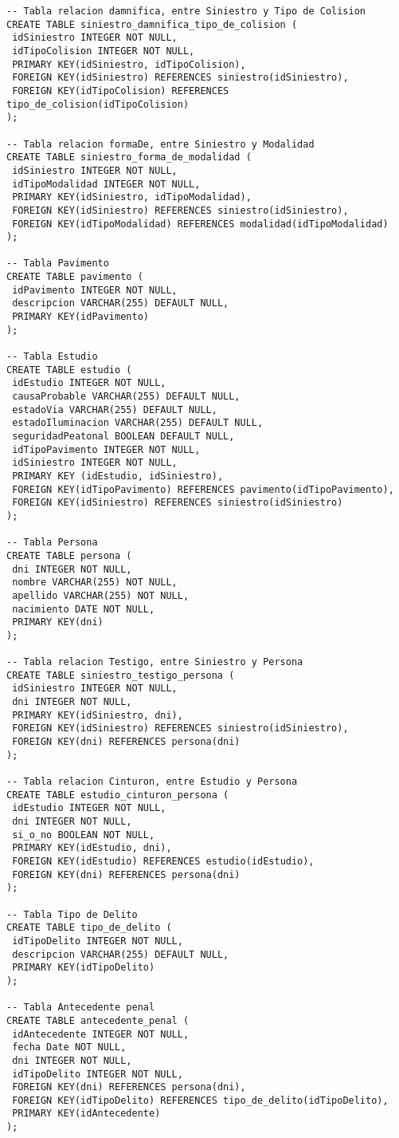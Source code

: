 \begin{verbatim}
-- Tabla relacion damnifica, entre Siniestro y Tipo de Colision
CREATE TABLE siniestro_damnifica_tipo_de_colision (
 idSiniestro INTEGER NOT NULL,
 idTipoColision INTEGER NOT NULL,
 PRIMARY KEY(idSiniestro, idTipoColision),
 FOREIGN KEY(idSiniestro) REFERENCES siniestro(idSiniestro),
 FOREIGN KEY(idTipoColision) REFERENCES tipo_de_colision(idTipoColision)
);

-- Tabla relacion formaDe, entre Siniestro y Modalidad
CREATE TABLE siniestro_forma_de_modalidad (
 idSiniestro INTEGER NOT NULL,
 idTipoModalidad INTEGER NOT NULL,
 PRIMARY KEY(idSiniestro, idTipoModalidad),
 FOREIGN KEY(idSiniestro) REFERENCES siniestro(idSiniestro),
 FOREIGN KEY(idTipoModalidad) REFERENCES modalidad(idTipoModalidad)
);

-- Tabla Pavimento
CREATE TABLE pavimento (
 idPavimento INTEGER NOT NULL,
 descripcion VARCHAR(255) DEFAULT NULL,
 PRIMARY KEY(idPavimento)
);

-- Tabla Estudio
CREATE TABLE estudio (
 idEstudio INTEGER NOT NULL,
 causaProbable VARCHAR(255) DEFAULT NULL,
 estadoVia VARCHAR(255) DEFAULT NULL,
 estadoIluminacion VARCHAR(255) DEFAULT NULL,
 seguridadPeatonal BOOLEAN DEFAULT NULL,
 idTipoPavimento INTEGER NOT NULL,
 idSiniestro INTEGER NOT NULL,
 PRIMARY KEY (idEstudio, idSiniestro),
 FOREIGN KEY(idTipoPavimento) REFERENCES pavimento(idTipoPavimento),
 FOREIGN KEY(idSiniestro) REFERENCES siniestro(idSiniestro)
);

-- Tabla Persona
CREATE TABLE persona (
 dni INTEGER NOT NULL,
 nombre VARCHAR(255) NOT NULL,
 apellido VARCHAR(255) NOT NULL,
 nacimiento DATE NOT NULL,
 PRIMARY KEY(dni)
);

-- Tabla relacion Testigo, entre Siniestro y Persona
CREATE TABLE siniestro_testigo_persona (
 idSiniestro INTEGER NOT NULL,
 dni INTEGER NOT NULL,
 PRIMARY KEY(idSiniestro, dni),
 FOREIGN KEY(idSiniestro) REFERENCES siniestro(idSiniestro),
 FOREIGN KEY(dni) REFERENCES persona(dni)
);

-- Tabla relacion Cinturon, entre Estudio y Persona
CREATE TABLE estudio_cinturon_persona (
 idEstudio INTEGER NOT NULL,
 dni INTEGER NOT NULL,
 si_o_no BOOLEAN NOT NULL,
 PRIMARY KEY(idEstudio, dni),
 FOREIGN KEY(idEstudio) REFERENCES estudio(idEstudio),
 FOREIGN KEY(dni) REFERENCES persona(dni)
);

-- Tabla Tipo de Delito
CREATE TABLE tipo_de_delito (
 idTipoDelito INTEGER NOT NULL,
 descripcion VARCHAR(255) DEFAULT NULL,
 PRIMARY KEY(idTipoDelito)
);

-- Tabla Antecedente penal
CREATE TABLE antecedente_penal (
 idAntecedente INTEGER NOT NULL,
 fecha Date NOT NULL,
 dni INTEGER NOT NULL,
 idTipoDelito INTEGER NOT NULL,
 FOREIGN KEY(dni) REFERENCES persona(dni),
 FOREIGN KEY(idTipoDelito) REFERENCES tipo_de_delito(idTipoDelito),
 PRIMARY KEY(idAntecedente)
);


\end{verbatim}

